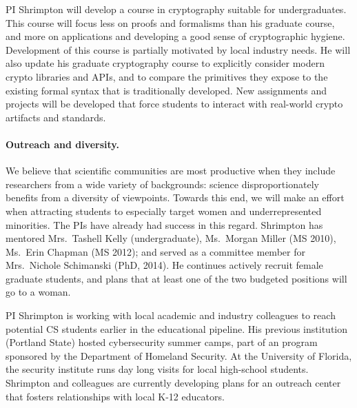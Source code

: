 PI Shrimpton will develop a course in cryptography suitable for undergraduates.  This course will focus less on proofs and
formalisms than his graduate course, and more on applications and developing a good sense of
cryptographic hygiene.  Development of this course is partially
motivated by local industry needs.  
%
He will also update his graduate
cryptography course to explicitly consider modern crypto libraries and
APIs, and to compare the primitives they expose to the existing formal
syntax that is traditionally developed.  New assignments and projects
will be developed that force students to interact with real-world
crypto artifacts and standards.

\paragraph{Outreach and diversity.} We believe that scientific
communities are most productive when they include researchers from a wide
variety of backgrounds: science disproportionately benefits from a diversity of
viewpoints.  Towards this end,  we will make an effort when attracting students
to especially target women and underrepresented minorities.  The PIs have
already had success in this regard.  Shrimpton has mentored Mrs.\ Tashell
Kelly (undergraduate), 
Ms.\ Morgan Miller (MS 2010), Ms.\ Erin Chapman (MS 2012); 
and served as a committee member for Mrs.\ Nichole Schimanski (PhD,
2014).  He continues actively recruit female graduate students, and
plans that at least one of the two budgeted positions will go to a woman.

PI Shrimpton is working with local academic and industry colleagues 
to reach potential CS students earlier in the educational pipeline.
His previous institution (Portland
State) hosted cybersecurity summer camps, part of an program
sponsored by the Department of Homeland Security.  At the University
of Florida, the security institute runs day long visits for local
high-school students.  Shrimpton and colleagues
are currently developing plans for an outreach center that fosters 
relationships with local K-12 educators. 

